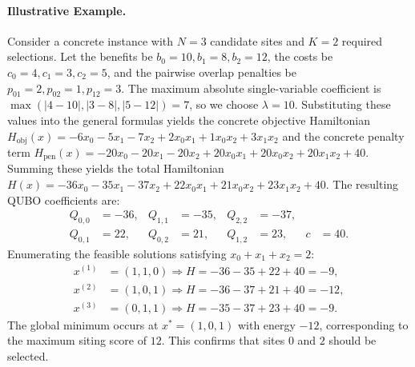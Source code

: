 \documentclass[12pt]{article}
\begin{document}
\paragraph{Illustrative Example.}
Consider a concrete instance with $N=3$ candidate sites and $K=2$ required selections. Let the benefits be $b_0=10, b_1=8, b_2=12$, the costs be $c_0=4, c_1=3, c_2=5$, and the pairwise overlap penalties be $p_{01}=2, p_{02}=1, p_{12}=3$. The maximum absolute single-variable coefficient is $\max(|4-10|, |3-8|, |5-12|) = 7$, so we choose $\lambda = 10$. Substituting these values into the general formulas yields the concrete objective Hamiltonian $H_{\text{obj}}(x) = -6x_0 - 5x_1 - 7x_2 + 2x_0x_1 + 1x_0x_2 + 3x_1x_2$ and the concrete penalty term $H_{\text{pen}}(x) = -20x_0 - 20x_1 - 20x_2 + 20x_0x_1 + 20x_0x_2 + 20x_1x_2 + 40$. Summing these yields the total Hamiltonian $H(x) = -36x_0 - 35x_1 - 37x_2 + 22x_0x_1 + 21x_0x_2 + 23x_1x_2 + 40$. The resulting QUBO coefficients are:
\begin{align}
    Q_{0,0} &= -36, & Q_{1,1} &= -35, & Q_{2,2} &= -37, \\
    Q_{0,1} &= 22, & Q_{0,2} &= 21, & Q_{1,2} &= 23, & c &= 40.
\end{align}
Enumerating the feasible solutions satisfying $x_0+x_1+x_2=2$:
\begin{align}
    x^{(1)} &= (1,1,0) \Rightarrow H = -36 - 35 + 22 + 40 = -9, \\
    x^{(2)} &= (1,0,1) \Rightarrow H = -36 - 37 + 21 + 40 = -12, \\
    x^{(3)} &= (0,1,1) \Rightarrow H = -35 - 37 + 23 + 40 = -9.
\end{align}
The global minimum occurs at $x^* = (1,0,1)$ with energy $-12$, corresponding to the maximum siting score of $12$. This confirms that sites $0$ and $2$ should be selected.
\end{document}
